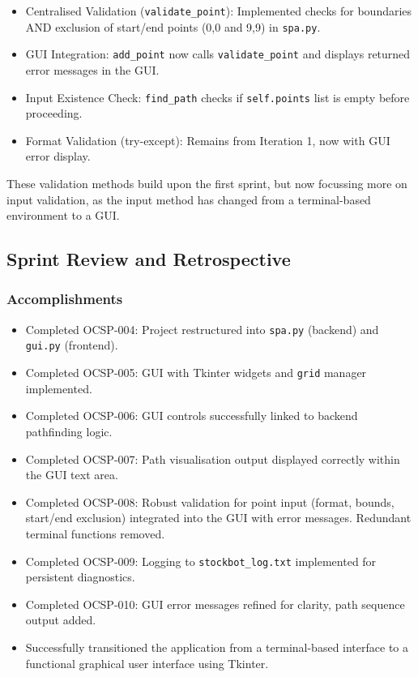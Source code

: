 \begin{itemize}
	\item Centralised Validation (\verb|validate_point|): Implemented checks for boundaries AND exclusion of start/end points (0,0 and 9,9) in \verb|spa.py|.
	\item GUI Integration: \verb|add_point| now calls \verb|validate_point| and displays returned error messages in the GUI.
	\item Input Existence Check: \verb|find_path| checks if \verb|self.points| list is empty before proceeding.
	\item Format Validation (try-except): Remains from Iteration 1, now with GUI error display.
\end{itemize}

These validation methods build upon the first sprint, but now focussing more on input validation, as the input method has changed from a terminal-based environment to a GUI.

\newpage %

\clearpage
\subsection{Sprint Review and Retrospective}

\subsubsection{Accomplishments}
\begin{itemize}
	\item Completed OCSP-004: Project restructured into \verb|spa.py| (backend) and \verb|gui.py| (frontend).
	\item Completed OCSP-005: GUI with Tkinter widgets and \verb|grid| manager implemented.
	\item Completed OCSP-006: GUI controls successfully linked to backend pathfinding logic.
	\item Completed OCSP-007: Path visualisation output displayed correctly within the GUI text area.
	\item Completed OCSP-008: Robust validation for point input (format, bounds, start/end exclusion) integrated into the GUI with error messages. Redundant terminal functions removed.
	\item Completed OCSP-009: Logging to \verb|stockbot_log.txt| implemented for persistent diagnostics.
	\item Completed OCSP-010: GUI error messages refined for clarity, path sequence output added.
	\item Successfully transitioned the application from a terminal-based interface to a functional graphical user interface using Tkinter.
\end{itemize}


